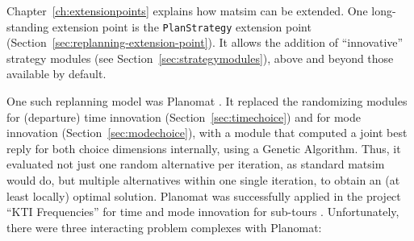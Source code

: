 Chapter~\ref{ch:extensionpoints} explains how \gls{matsim} can be extended. One long-standing extension point is the \lstinline{PlanStrategy} extension point (Section~\ref{sec:replanning-extension-point}). It allows the addition of ``innovative'' strategy modules (see Section~\ref{sec:strategymodules}), above and beyond those available by default.

One such replanning model was Planomat \citep[][]{MeisterBalmerEtc2006planomatIatbr, %
Meister_PhDThesis_2011}. It replaced the randomizing modules for (departure) time innovation (Section~\ref{sec:timechoice}) and for mode innovation (Section~\ref{sec:modechoice}), with a module that computed a joint best reply for both choice dimensions internally, using a Genetic Algorithm. Thus, it evaluated not just one random alternative per iteration, as standard \gls{matsim} would do, but multiple alternatives within one single iteration, to obtain an (at least locally) optimal solution. Planomat was successfully applied in the project ``KTI Frequencies'' for time and mode innovation for sub-tours \citep[][p.10]{BalmerEtAl_ResRep_datapuls_2010}.
Unfortunately, there were three interacting problem complexes with Planomat:
%
